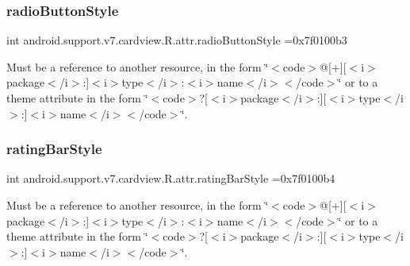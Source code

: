\subsubsection{\texorpdfstring{radio\+Button\+Style}{radioButtonStyle}}
{\footnotesize\ttfamily int android.\+support.\+v7.\+cardview.\+R.\+attr.\+radio\+Button\+Style =0x7f0100b3\hspace{0.3cm}{\ttfamily [static]}}

Must be a reference to another resource, in the form \char`\"{}$<$code$>$@\mbox{[}+\mbox{]}\mbox{[}$<$i$>$package$<$/i$>$\+:\mbox{]}$<$i$>$type$<$/i$>$\+:$<$i$>$name$<$/i$>$$<$/code$>$\char`\"{} or to a theme attribute in the form \char`\"{}$<$code$>$?\mbox{[}$<$i$>$package$<$/i$>$\+:\mbox{]}\mbox{[}$<$i$>$type$<$/i$>$\+:\mbox{]}$<$i$>$name$<$/i$>$$<$/code$>$\char`\"{}. \mbox{\label{classandroid_1_1support_1_1v7_1_1cardview_1_1R_1_1attr_a77d242b065131572dca159bfb4618c36}} 
\subsubsection{\texorpdfstring{rating\+Bar\+Style}{ratingBarStyle}}
{\footnotesize\ttfamily int android.\+support.\+v7.\+cardview.\+R.\+attr.\+rating\+Bar\+Style =0x7f0100b4\hspace{0.3cm}{\ttfamily [static]}}

Must be a reference to another resource, in the form \char`\"{}$<$code$>$@\mbox{[}+\mbox{]}\mbox{[}$<$i$>$package$<$/i$>$\+:\mbox{]}$<$i$>$type$<$/i$>$\+:$<$i$>$name$<$/i$>$$<$/code$>$\char`\"{} or to a theme attribute in the form \char`\"{}$<$code$>$?\mbox{[}$<$i$>$package$<$/i$>$\+:\mbox{]}\mbox{[}$<$i$>$type$<$/i$>$\+:\mbox{]}$<$i$>$name$<$/i$>$$<$/code$>$\char`\"{}. \mbox{\label{classandroid_1_1support_1_1v7_1_1cardview_1_1R_1_1attr_a5b7894890d0ccca978ea0fc38f92c66e}} 
